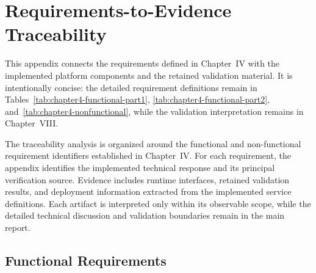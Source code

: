 \chapter{Requirements-to-Evidence Traceability}
\label{app:requirements-traceability}

This appendix connects the requirements defined in Chapter~IV with the implemented platform components and the retained validation material. It is intentionally concise: the detailed requirement definitions remain in Tables~\ref{tab:chapter4-functional-part1}, \ref{tab:chapter4-functional-part2}, and~\ref{tab:chapter4-nonfunctional}, while the validation interpretation remains in Chapter~VIII.

The traceability analysis is organized around the functional and non-functional requirement identifiers established in Chapter~IV. For each requirement, the appendix identifies the implemented technical response and its principal verification source. Evidence includes runtime interfaces, retained validation results, and deployment information extracted from the implemented service definitions. Each artifact is interpreted only within its observable scope, while the detailed technical discussion and validation boundaries remain in the main report.

\section{Functional Requirements}

